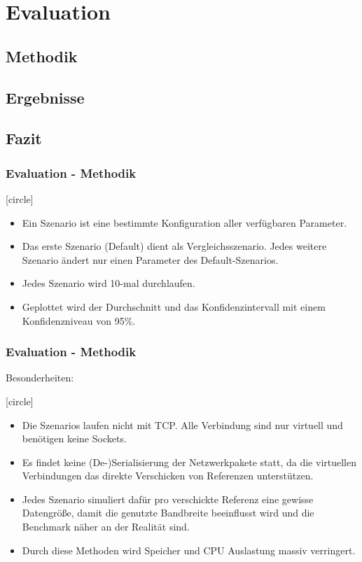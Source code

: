 
\section{Evaluation}

\subsection{Methodik}
\subsection{Ergebnisse}
\subsection{Fazit}

\begin{frame}
  \frametitle{Evaluation - Methodik}
  [circle]
  \begin{itemize}  
    \item Ein Szenario ist eine bestimmte Konfiguration aller verfügbaren Parameter.
    \item Das erste Szenario (Default) dient als Vergleichsszenario. Jedes weitere Szenario ändert nur einen Parameter des Default-Szenarios.
    \item Jedes Szenario wird 10-mal durchlaufen. 
    \item Geplottet wird der Durchschnitt und das Konfidenzintervall mit einem Konfidenzniveau von 95\%.
  \end{itemize}	
\end{frame}



\begin{frame}
  \frametitle{Evaluation - Methodik}

  Besonderheiten:

  [circle]
  \begin{itemize}  
    \item Die Szenarios laufen nicht mit TCP. Alle Verbindung sind nur virtuell und benötigen keine Sockets.
    \item Es findet keine (De-)Serialisierung der Netzwerkpakete statt, da die virtuellen Verbindungen das direkte Verschicken von Referenzen unterstützen.
    \item Jedes Szenario simuliert dafür pro verschickte Referenz eine gewisse Datengröße, damit die genutzte Bandbreite beeinflusst wird und die Benchmark näher an der Realität sind.
    \item Durch diese Methoden wird Speicher und CPU Auslastung massiv verringert.
  \end{itemize} 

\end{frame}


